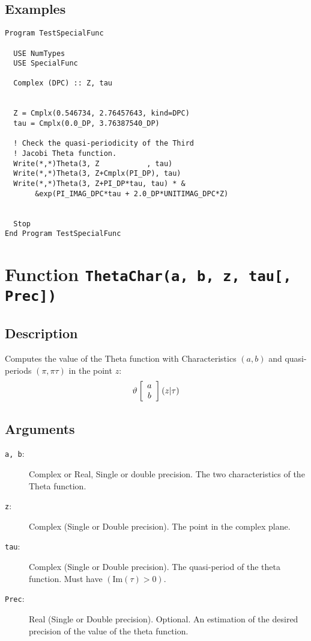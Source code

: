 \subsection{Examples}

\begin{lstlisting}[emph=Theta,
                   emphstyle=\color{blue},
                   frame=trBL,
                   caption=Computing the Jacobi Theta functions.,
                   label=theta]
Program TestSpecialFunc

  USE NumTypes
  USE SpecialFunc

  Complex (DPC) :: Z, tau


  Z = Cmplx(0.546734, 2.76457643, kind=DPC)
  tau = Cmplx(0.0_DP, 3.76387540_DP)

  ! Check the quasi-periodicity of the Third
  ! Jacobi Theta function.
  Write(*,*)Theta(3, Z           , tau)
  Write(*,*)Theta(3, Z+Cmplx(PI_DP), tau)
  Write(*,*)Theta(3, Z+PI_DP*tau, tau) * &
       &exp(PI_IMAG_DPC*tau + 2.0_DP*UNITIMAG_DPC*Z)


  Stop
End Program TestSpecialFunc
\end{lstlisting}

\section{Function \texttt{ThetaChar(a, b, z, tau[, Prec])}}

\subsection{Description}

Computes the value of the Theta function with Characteristics $(a,b)$
and quasi-periods $(\pi,\pi\tau)$ in the point $z$:
\begin{equation}
  \vartheta\left[ \begin{array}{c} a \\ b \end{array}\right]\left(z|\tau\right)
\end{equation}

\subsection{Arguments}

\begin{description}
\item[\texttt{a, b}:] Complex or Real, Single or double precision. The
  two characteristics of the Theta function.
\item[\texttt{z}:] Complex (Single or Double precision). The point in
  the complex plane.
\item[\texttt{tau}:] Complex (Single or Double precision). The
  quasi-period of the theta function. Must have $(\textrm{Im}(\tau)>0)$.
\item[\texttt{Prec}:] Real (Single or Double precision). Optional. An
  estimation of the desired precision of the value of the theta
  function. 
\end{description}

